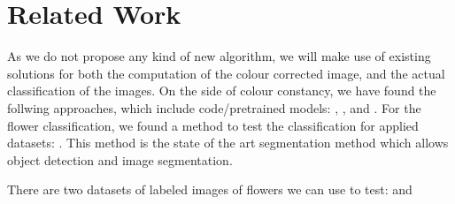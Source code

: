 \section{Related Work}

As we do not propose any kind of new algorithm, we will make use of existing solutions for both
the computation of the colour corrected image, and the actual classification of the images.
On the side of colour constancy, we have found the follwing approaches, which include code/pretrained models:
\cite{hu2017fc}, \cite{afifi2018}, \cite{afifi2021} and \cite{Lo_2021_CVPR}.
For the flower classification, we found a method to test the classification for applied datasets: \cite{glenn_jocher_2022_7347926}.
This method is the state of the art segmentation method which allows object detection and image 
segmentation. 

There are two datasets of labeled images of flowers we can use to test: \cite{Nilsback06} and \cite{Nilsback08}



